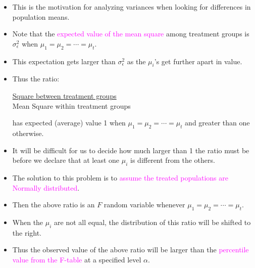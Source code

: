 \documentclass[xcolor=dvipsnames,12pt]{beamer}
\begin{document}
\begin{frame}
\begin{itemize}
\item This is the motivation for analyzing variances when looking for
differences in population means. 
\item Note that the  \textcolor{magenta}{expected value of the mean square} among
 treatment groups is $\sigma_\epsilon^2$ when
$\mu_1 = \mu_2 = \cdots = \mu_t$.
\item This expectation gets larger than $\sigma_\epsilon^2$ as the $\mu_i$'s 
get further apart in value.
\item Thus the ratio:\\[-.5in]
\begin{small}
\begin{center}
\underline{ Square between treatment groups}\\
Mean Square within treatment groups
\end{center}
\end{small}
has expected (average) value 1 when $\mu_1 = \mu_2 = \cdots = \mu_t$
and greater than one otherwise.
\end{itemize}
\end{frame}



\begin{frame}
\begin{itemize}
\item It will be difficult for us to decide how much larger than 1 the
ratio must be before we declare that at least one $\mu_i$ is
different from the others.
\item The solution to  this problem is to \textcolor{magenta}{ assume the} 
\textcolor{magenta}{ treated populations} \textcolor{magenta}{ are Normally distributed}.  
\item Then the
above ratio is an $F$ random variable whenever 
$\mu_1 = \mu_2 = \cdots = \mu_t$.
\item When the $\mu_i$ are not all equal, the distribution of this ratio
 will be shifted to the right. 
\item Thus the observed value of the above ratio
will be larger than the  \textcolor{magenta}{percentile value from the F-table}
at a specified level $\alpha$.  
\end{itemize}
\end{frame}
\end{document}
